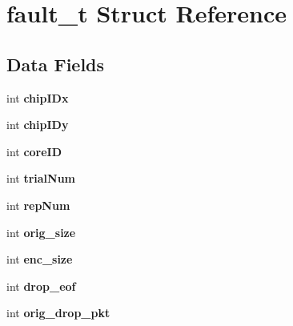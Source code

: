 \hypertarget{structfault__t}{}\section{fault\+\_\+t Struct Reference}
\label{structfault__t}
\subsection*{Data Fields}
\begin{DoxyCompactItemize}
\item 
int {\bfseries chip\+I\+Dx}\hypertarget{structfault__t_a1dc2355fd39d268bfdc02f7bcab7f702}{}\label{structfault__t_a1dc2355fd39d268bfdc02f7bcab7f702}

\item 
int {\bfseries chip\+I\+Dy}\hypertarget{structfault__t_a13ed8b64b954f5f2374792ea0f8129d9}{}\label{structfault__t_a13ed8b64b954f5f2374792ea0f8129d9}

\item 
int {\bfseries core\+ID}\hypertarget{structfault__t_a78fa30620fa7b5977600f1b45bac6d58}{}\label{structfault__t_a78fa30620fa7b5977600f1b45bac6d58}

\item 
int {\bfseries trial\+Num}\hypertarget{structfault__t_a071b4eef73fd1544233c839d656b4957}{}\label{structfault__t_a071b4eef73fd1544233c839d656b4957}

\item 
int {\bfseries rep\+Num}\hypertarget{structfault__t_a8e215e64ab8c34f91334c378bae1c1e0}{}\label{structfault__t_a8e215e64ab8c34f91334c378bae1c1e0}

\item 
int {\bfseries orig\+\_\+size}\hypertarget{structfault__t_a666747105d36c60b0f4b57cfbbb009ae}{}\label{structfault__t_a666747105d36c60b0f4b57cfbbb009ae}

\item 
int {\bfseries enc\+\_\+size}\hypertarget{structfault__t_a4f621041440c421dda7b105fe36b49d4}{}\label{structfault__t_a4f621041440c421dda7b105fe36b49d4}

\item 
int {\bfseries drop\+\_\+eof}\hypertarget{structfault__t_a97ffe6bc756977a9e1e0bb0a9dccd925}{}\label{structfault__t_a97ffe6bc756977a9e1e0bb0a9dccd925}

\item 
int {\bfseries orig\+\_\+drop\+\_\+pkt}\hypertarget{structfault__t_adcf6e1e087a7be406926fff7c16c70e1}{}\label{structfault__t_adcf6e1e087a7be406926fff7c16c70e1}


\end{DoxyCompactItemize}
